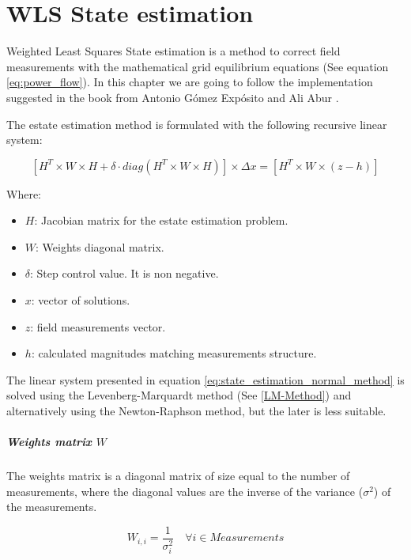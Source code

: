 \documentclass[a4paper,twoside,fleqn]{tufte-book}
\begin{document}
\chapter{WLS State estimation}

Weighted Least Squares State estimation is a method to correct field measurements with the mathematical grid equilibrium equations (See equation \ref{eq:power_flow}). In this chapter we are going to follow the implementation suggested in the book from Antonio G\'omez Exp\'osito and Ali Abur \cite{gomez2004power}.

The estate estimation method is formulated with the following recursive linear system:

$$
\left[H^T \times W \times H + \delta \cdot diag(H^T \times W \times H)\right] \times \Delta x = \left[H^T \times W \times (z-h) \right]
\label{eq:state_estimation_normal_method}
$$

Where:

\begin{itemize}
	\item $H$: Jacobian matrix for the estate estimation problem.
	\item $W$: Weights diagonal matrix.
	\item $\delta$: Step control value. It is non negative.
	\item $x$: vector of solutions.
	\item $z$: field measurements vector.
	\item $h$: calculated magnitudes matching measurements structure.
\end{itemize}

The linear system presented in equation \ref{eq:state_estimation_normal_method} is solved using the Levenberg-Marquardt method (See \ref{LM-Method}) and alternatively using the Newton-Raphson method, but the later is less suitable.

\paragraph{Weights matrix $W$}

The weights matrix is a diagonal matrix of size equal to the number of measurements, where the diagonal values are the inverse of the variance ($\sigma^2$) of the measurements.


\begin{equation}
W_{i, i} = \frac{1}{\sigma_i^2} \quad \forall i \in {Measurements}
\label{eq:SE_W}
\end{equation}
\end{document}
